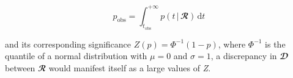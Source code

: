 \begin{equation}\label{eq:pval}
    p_{\text{obs}}=\int_{t_{\text{obs}}}^{+\infty}p(t\,|\,\mathbfcal{R})\,\text{d}t
\end{equation}

\noindent and its corresponding significance $Z(p)=\Phi^{-1}(1-p)$, where $\Phi^{-1}$ is the quantile of a normal
distribution with $\mu=0$ and $\sigma=1$, a discrepancy in $\mathbfcal{D}$ between $\mathbfcal{R}$ would
manifest itself as a large values of \textit{Z}.  


